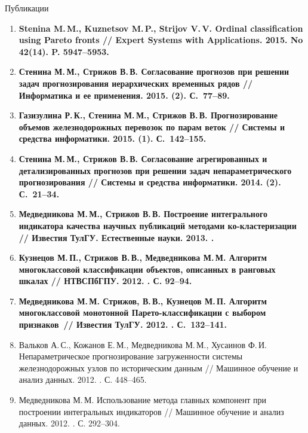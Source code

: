 \documentclass{beamer}
\begin{document}
\begin{frame}{Публикации}
\scriptsize \vspace{-0.3cm}
    \begin{enumerate}
    \item
        \textbf{Stenina M.\,M., Kuznetsov M.\,P., Strijov V.\,V. Ordinal
        classification using Pareto fronts // Expert Systems with
        Applications. 2015. No 42(14). P. 5947--5953.}
    \item
        \textbf{Стенина М.\,М., Стрижов В.\,В. Согласование прогнозов при
        решении задач прогнозирования иерархических временных
        рядов // Информатика и ее применения. 2015. (2). С.~77--89.}
    \item
        \textbf{Газизулина Р.\,К., Стенина М.\,М., Стрижов В.\,В.
        Прогнозирование объемов железнодорожных перевозок по
        парам веток // Системы и средства информатики. 2015. (1). С.~142--155.}
    \item
        \textbf{Стенина М.\,М., Стрижов В.\,В. Согласование
        агрегированных и детализированных прогнозов при решении
        задач непараметрического прогнозирования // Системы и
        средства информатики. 2014. (2). С.~21--34.}
    \item
        \textbf{Медведникова М.\,М., Стрижов В.\,В. Построение интегрального
        индикатора качества научных публикаций методами ко-кластеризации
        // Известия ТулГУ. Естественные науки. 2013. .}
    \item
        \textbf{Кузнецов М.\,П., Стрижов В.\,В., Медведникова М.\,М. Алгоритм
        многоклассовой классификации объектов, описанных в ранговых шкалах
        // НТВСПбГПУ. 2012. . С. 92--94.}
    \item
        \textbf{Медведникова М.\,М. Стрижов, В.\,В., Кузнецов М.\,П. Алгоритм
        многоклассовой монотонной Парето-классификации с выбором признаков~//
        Известия ТулГУ. 2012. . С.~132--141.}
    \item
        Вальков А.\,С., Кожанов Е.\,М., Медведникова М.\,М.,
        Хусаинов Ф.\,И. Непараметрическое прогнозирование загруженности
        системы железнодорожных узлов по историческим данным // Машинное
        обучение и анализ данных. 2012. . С. 448--465.
    \item
        Медведникова М.\,М. Использование метода главных компонент при
        построении интегральных индикаторов // Машинное обучение и анализ
        данных. 2012. . С. 292--304.
    \end{enumerate}
\end{frame}
\end{document}
